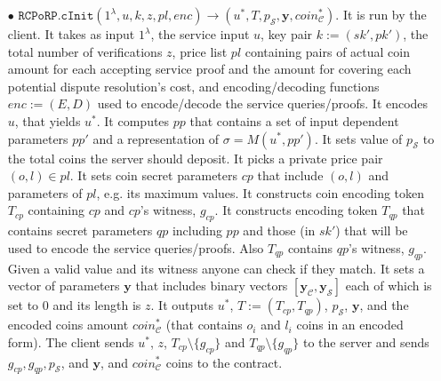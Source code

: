 \begin{definition}
\begin{itemize}
\item[$\bullet$] $\mathtt{RCPoRP}.\mathtt{cInit}(1^{\scriptscriptstyle\lambda}, u, k, z, pl,enc)\rightarrow (u^{\scriptscriptstyle *},T, p_{\scriptscriptstyle\mathcal S},  \bm{y}, coin^{\scriptscriptstyle*}_{\scriptscriptstyle\mathcal C})$. It is run by the client. It takes as input $1^{\scriptscriptstyle\lambda}$,  the service input $u$, key pair  $k:=(sk', pk')$,   the total number of verifications $z$,   price list $pl$ containing pairs of  actual coin amount for each accepting service proof and the amount for covering each potential dispute resolution's cost, and encoding/decoding functions $enc:=(E,D)$ used to encode/decode the service queries/proofs.  It encodes $u$, that yields  $u^{\scriptscriptstyle *}$. It computes $pp$ that contains a set of input dependent parameters $pp'$ and a  representation of $\sigma=M(u^{\scriptscriptstyle *},{pp'})$. It sets value of $p_{\scriptscriptstyle\mathcal S}$ to the total coins the server should deposit. It picks a private price pair $(o,l)\in pl$. It sets coin secret parameters $cp$ that include $(o,l)$ and parameters of $pl$, e.g. its maximum values. It constructs coin encoding token $T_{\scriptscriptstyle cp}$ containing   $cp$ and   $cp$'s witness, $g_{\scriptscriptstyle cp}$. It   constructs  encoding token $T_{\scriptscriptstyle qp}$ that contains secret  parameters $qp$ including {$pp$} and those (in $sk'$) that will be used to encode the service queries/proofs. Also  $T_{\scriptscriptstyle qp}$ contains     $qp$'s witness,  $g_{\scriptscriptstyle qp}$.   Given a valid value and its witness  anyone can check if they match. It sets a vector of parameters $\bm{y}$ that includes  binary vectors $[\bm{y}_{\scriptscriptstyle \mathcal  C}, \bm{y}_{\scriptscriptstyle \mathcal  S}]$ each of which is set to $0$ and its length is $z$.  It outputs  $u^{\scriptscriptstyle *}$,   $T:=(T_{\scriptscriptstyle cp},T_{\scriptscriptstyle qp})$,  $p_{\scriptscriptstyle\mathcal S}$,    $\bm{y}$,  and the encoded coins amount  $coin^{\scriptscriptstyle*}_{\scriptscriptstyle\mathcal C}$ (that contains $o_{\scriptscriptstyle i}$ and $l_{\scriptscriptstyle i}$ coins in an encoded form). The client sends  $u^{\scriptscriptstyle *}$, $z$, $T_{\scriptscriptstyle cp} \setminus  \{g_{\scriptscriptstyle cp}\}$ and $T_{\scriptscriptstyle qp} \setminus  \{g_{\scriptscriptstyle qp}\}$ to the server and  sends $g_{\scriptscriptstyle cp},  g_{\scriptscriptstyle qp},p_{\scriptscriptstyle\mathcal S}$, and $\bm{y}$,  and $coin^{\scriptscriptstyle*}_{\scriptscriptstyle\mathcal C}$  coins to the  contract. 






\end{itemize}
\end{definition}
